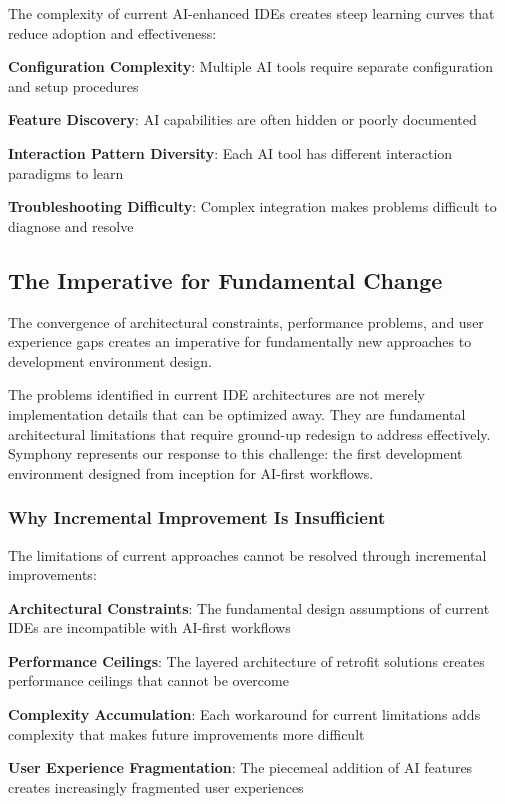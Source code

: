 The complexity of current AI-enhanced IDEs creates steep learning curves that reduce adoption and effectiveness:

\begin{compactlist}
    \item \textbf{Configuration Complexity}: Multiple AI tools require separate configuration and setup procedures
    \item \textbf{Feature Discovery}: AI capabilities are often hidden or poorly documented
    \item \textbf{Interaction Pattern Diversity}: Each AI tool has different interaction paradigms to learn
    \item \textbf{Troubleshooting Difficulty}: Complex integration makes problems difficult to diagnose and resolve
\end{compactlist}

\subsection{The Imperative for Fundamental Change}
\label{subsec:imperative-change}

The convergence of architectural constraints, performance problems, and user experience gaps creates an imperative for fundamentally new approaches to development environment design.

\begin{successbox}
The problems identified in current IDE architectures are not merely implementation details that can be optimized away. They are fundamental architectural limitations that require ground-up redesign to address effectively. Symphony represents our response to this challenge: the first development environment designed from inception for AI-first workflows.
\end{successbox}

\subsubsection{Why Incremental Improvement Is Insufficient}

The limitations of current approaches cannot be resolved through incremental improvements:

\begin{expandedlist}
    \item \textbf{Architectural Constraints}: The fundamental design assumptions of current IDEs are incompatible with AI-first workflows
    
    \item \textbf{Performance Ceilings}: The layered architecture of retrofit solutions creates performance ceilings that cannot be overcome
    
    \item \textbf{Complexity Accumulation}: Each workaround for current limitations adds complexity that makes future improvements more difficult
    
    \item \textbf{User Experience Fragmentation}: The piecemeal addition of AI features creates increasingly fragmented user experiences
\end{expandedlist}


